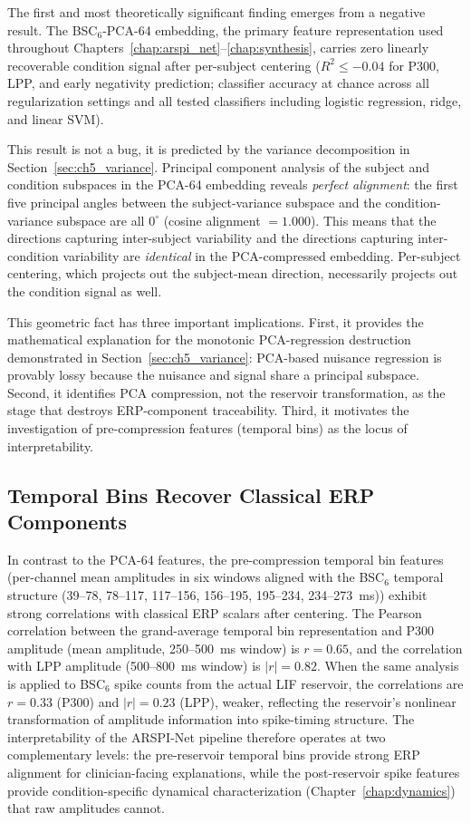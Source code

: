 The first and most theoretically significant finding emerges from a negative result. The BSC$_6$-PCA-64 embedding, the primary feature representation used throughout Chapters~\ref{chap:arspi_net}--\ref{chap:synthesis}, carries zero linearly recoverable condition signal after per-subject centering ($R^2 \leq -0.04$ for P300, LPP, and early negativity prediction; classifier accuracy at chance across all regularization settings and all tested classifiers including logistic regression, ridge, and linear SVM).

This result is not a bug, it is predicted by the variance decomposition in Section~\ref{sec:ch5_variance}. Principal component analysis of the subject and condition subspaces in the PCA-64 embedding reveals \emph{perfect alignment}: the first five principal angles between the subject-variance subspace and the condition-variance subspace are all $0^\circ$ (cosine alignment $= 1.000$). This means that the directions capturing inter-subject variability and the directions capturing inter-condition variability are \emph{identical} in the PCA-compressed embedding. Per-subject centering, which projects out the subject-mean direction, necessarily projects out the condition signal as well.

This geometric fact has three important implications. First, it provides the mathematical explanation for the monotonic PCA-regression destruction demonstrated in Section~\ref{sec:ch5_variance}: PCA-based nuisance regression is provably lossy because the nuisance and signal share a principal subspace. Second, it identifies PCA compression, not the reservoir transformation, as the stage that destroys ERP-component traceability. Third, it motivates the investigation of pre-compression features (temporal bins) as the locus of interpretability.

\subsection{Temporal Bins Recover Classical ERP Components}
\label{sec:erp_recovery}

In contrast to the PCA-64 features, the pre-compression temporal bin features (per-channel mean amplitudes in six windows aligned with the BSC$_6$ temporal structure (39--78, 78--117, 117--156, 156--195, 195--234, 234--273~ms)) exhibit strong correlations with classical ERP scalars after centering. The Pearson correlation between the grand-average temporal bin representation and P300 amplitude (mean amplitude, 250--500~ms window) is $r = 0.65$, and the correlation with LPP amplitude (500--800~ms window) is $|r| = 0.82$. When the same analysis is applied to BSC$_6$ spike counts from the actual LIF reservoir, the correlations are $r = 0.33$ (P300) and $|r| = 0.23$ (LPP), weaker, reflecting the reservoir's nonlinear transformation of amplitude information into spike-timing structure. The interpretability of the ARSPI-Net pipeline therefore operates at two complementary levels: the pre-reservoir temporal bins provide strong ERP alignment for clinician-facing explanations, while the post-reservoir spike features provide condition-specific dynamical characterization (Chapter~\ref{chap:dynamics}) that raw amplitudes cannot.

